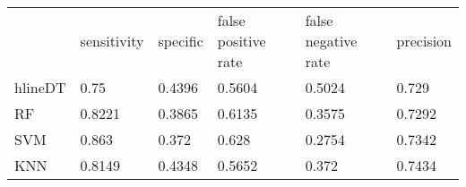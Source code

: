 \begin{table}[!h]
\begin{tabular}{l | l | l| l| l | l}
 & sensitivity & specific & false positive rate & false negative rate & precision \\hlineDT & 0.75 & 0.4396 & 0.5604 & 0.5024 & 0.729\\
RF & 0.8221 & 0.3865 & 0.6135 & 0.3575 & 0.7292\\
SVM & 0.863 & 0.372 & 0.628 & 0.2754 & 0.7342\\
KNN & 0.8149 & 0.4348 & 0.5652 & 0.372 & 0.7434\\
\end{tabular}
\caption{}
\end{table}
